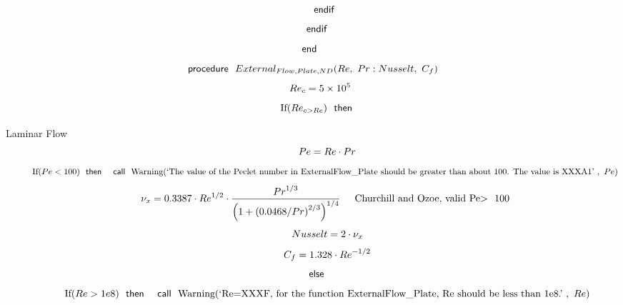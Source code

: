 \documentclass[10pt,fleqn]{article}
\newcommand{\F}[1]{\mbox{$#1$}}
\newcommand{\K}[1]{\mbox{\sf#1\ \ \mit}}
\newcommand{\KS}[1]{\mbox{\sf\ \ #1\ \ \mit}}
\newcommand{\SC}[1]{\mbox{`#1'}\  }
\newcommand{\V}[1]{\mbox{$ #1 $}}
\newcommand{\I}{\mbox{\hspace{0.20in}}}
\begin{document}
\begin{equation}
\I \I \label{EES Eqn:54}
\K{endif} 
\end{equation}
\begin{equation}
\I \label{EES Eqn:55}
\K{endif} 
\end{equation}
\begin{equation}
\label{EES Eqn:56}
\K{end} 
\end{equation}
\vspace{0.1 in}
\begin{equation}
\label{EES Eqn:57}
\K{procedure} \F{External_{Flow,Plate,ND}}{ \left( \V{Re} ,\ \V{Pr} : \V{Nusselt} ,\ C_{f} \right) } 
\end{equation}
\begin{equation}
\I \label{EES Eqn:58}
\V{Re} _{c}=5\times 10^{5} 
\end{equation}
\begin{equation}
\I \label{EES Eqn:59}
\mbox{If}{ \left( \V{Re} _{c>Re} \right) } \KS{then} 
\end{equation}

\vspace{0.10in}
\noindent
\rm Laminar Flow
\begin{equation}
\I \I \label{EES Eqn:60}
\V{Pe} =\V{Re} \cdot \V{Pr}  
\end{equation}
\begin{equation}
\I \I \label{EES Eqn:61}
\mbox{If}{ \left( \V{Pe<100}  \right) } \KS{then} \KS{call} \mbox{Warning}{ \left( \SC{The value of the Peclet number in ExternalFlow\_Plate should be greater than about 100. The value is XXXA1},\ \V{Pe}  \right) } 
\end{equation}
\begin{equation}
\I \I \label{EES Eqn:62}
\nu_{x}=0.3387\cdot Re^{1/2}\cdot \frac {\V{Pr} ^{1/3}}{  \left( 1+ \left( 0.0468/\V{Pr} \right) ^{2/3} \right) ^{1/4} } 
\mbox{\I Churchill and Ozoe, valid Pe$>$~ 100 }
\end{equation}
\begin{equation}
\I \I \label{EES Eqn:63}
\V{Nusselt} =2\cdot \nu_{x} 
\end{equation}
\begin{equation}
\I \I \label{EES Eqn:64}
C_{f}=1.328\cdot \V{Re} ^{-1/2} 
\end{equation}
\begin{equation}
\I \label{EES Eqn:65}
\K{else} 
\end{equation}
\begin{equation}
\I \I \label{EES Eqn:66}
\mbox{If}{ \left( \V{Re>1e8}  \right) } \KS{then} \KS{call} \mbox{Warning}{ \left( \SC{Re=XXXF, for the function ExternalFlow\_Plate, Re should be less than 1e8.},\ \V{Re}  \right) } 
\end{equation}
\end{document}
